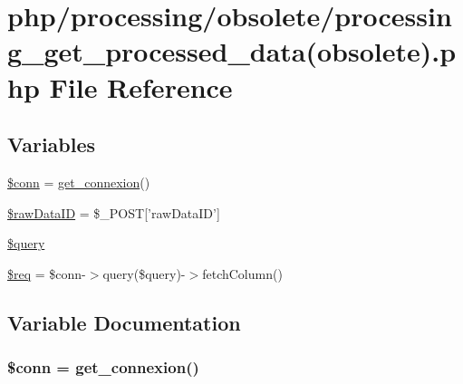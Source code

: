 \hypertarget{processing__get__processed__data_07obsolete_08_8php}{\section{php/processing/obsolete/processing\-\_\-get\-\_\-processed\-\_\-data(obsolete).php File Reference}
\label{processing__get__processed__data_07obsolete_08_8php}
}
\subsection*{Variables}
\begin{DoxyCompactItemize}
\item 
\hyperlink{processing__get__processed__data_07obsolete_08_8php_aa8a5a87b9c1a6a0819b88447cbe41877}{\$conn} = \hyperlink{php__functions_8php_ace18bc10f3fd08f92688ac743e0d8c2e}{get\-\_\-connexion}()
\item 
\hyperlink{processing__get__processed__data_07obsolete_08_8php_ae6bf2bba52343cb823edf89124ec5df1}{\$raw\-Data\-I\-D} = \$\-\_\-\-P\-O\-S\-T\mbox{[}'raw\-Data\-I\-D'\mbox{]}
\item 
\hyperlink{processing__get__processed__data_07obsolete_08_8php_af59a5f7cd609e592c41dc3643efd3c98}{\$query}
\item 
\hyperlink{processing__get__processed__data_07obsolete_08_8php_a63a7a283ea5dee8af1e2d5a3435bf370}{\$req} = \$conn-\/$>$query(\$query)-\/$>$fetch\-Column()
\end{DoxyCompactItemize}


\subsection{Variable Documentation}
\hypertarget{processing__get__processed__data_07obsolete_08_8php_aa8a5a87b9c1a6a0819b88447cbe41877}{
\subsubsection[{\$conn}]{\setlength{\rightskip}{0pt plus 5cm}\$conn = {\bf get\-\_\-connexion}()}}\label{processing__get__processed__data_07obsolete_08_8php_aa8a5a87b9c1a6a0819b88447cbe41877}


